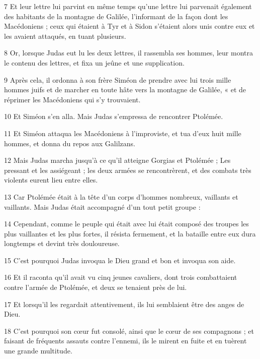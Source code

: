 \par 7 Et leur lettre lui parvint en même temps qu'une lettre lui parvenait également des habitants de la montagne de Galilée, l'informant de la façon dont les Macédoniens ; ceux qui étaient à Tyr et à Sidon s'étaient alors unis contre eux et les avaient attaqués, en tuant plusieurs.

\par 8 Or, lorsque Judas eut lu les deux lettres, il rassembla ses hommes, leur montra le contenu des lettres, et fixa un jeûne et une supplication.

\par 9 Après cela, il ordonna à son frère Siméon de prendre avec lui trois mille hommes juifs et de marcher en toute hâte vers la montagne de Galilée, « et de réprimer les Macédoniens qui s'y trouvaient.

\par 10 Et Siméon s'en alla. Mais Judas s'empressa de rencontrer Ptolémée.

\par 11 Et Siméon attaqua les Macédoniens à l'improviste, et tua d'eux huit mille hommes, et donna du repos aux Galilzans.

\par 12 Mais Judas marcha jusqu'à ce qu'il atteigne Gorgias et Ptolémée ; Les pressant et les assiégeant ; les deux armées se rencontrèrent, et des combats très violents eurent lieu entre elles.

\par 13 Car Ptolémée était à la tête d'un corps d'hommes nombreux, vaillants et vaillants. Mais Judas était accompagné d'un tout petit groupe :

\par 14 Cependant, comme le peuple qui était avec lui était composé des troupes les plus vaillantes et les plus fortes, il résista fermement, et la bataille entre eux dura longtemps et devint très douloureuse.

\par 15 C'est pourquoi Judas invoqua le Dieu grand et bon et invoqua son aide.

\par 16 Et il raconta qu'il avait vu cinq jeunes cavaliers, dont trois combattaient contre l'armée de Ptolémée, et deux se tenaient près de lui.

\par 17 Et lorsqu'il les regardait attentivement, ils lui semblaient être des anges de Dieu.

\par 18 C'est pourquoi son cœur fut consolé, ainsi que le cœur de ses compagnons ; et faisant de fréquents assauts contre l'ennemi, ils le mirent en fuite et en tuèrent une grande multitude.


